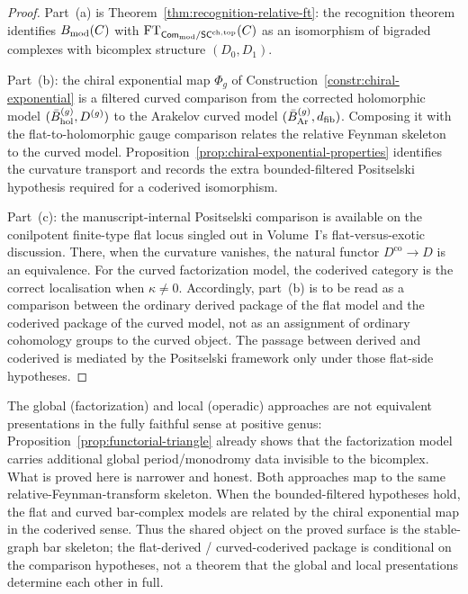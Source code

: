 \begin{proof}
Part~(a) is Theorem~\ref{thm:recognition-relative-ft}: the recognition theorem identifies $B_{\mathrm{mod}}(C)$ with $\mathrm{FT}_{\mathsf{Com}_{\mathrm{mod}} / \mathsf{SC}^{\mathrm{ch,top}}}(C)$ as an isomorphism of bigraded complexes with bicomplex structure $(D_0, D_1)$.

Part~(b): the chiral exponential map $\Phi_g$ of Construction~\ref{constr:chiral-exponential} is a filtered curved comparison from the corrected holomorphic model $(\bar{B}_{\mathrm{hol}}^{(g)},D^{(g)})$ to the Arakelov curved model $(\bar{B}_{\mathrm{Ar}}^{(g)}, d_{\mathrm{fib}})$. Composing it with the flat-to-holomorphic gauge comparison relates the relative Feynman skeleton to the curved model. Proposition~\ref{prop:chiral-exponential-properties} identifies the curvature transport and records the extra bounded-filtered Positselski hypothesis required for a coderived isomorphism.

Part~(c): the manuscript-internal Positselski comparison is available
on the conilpotent finite-type flat locus singled out in Volume~I's
flat-versus-exotic discussion.
There, when the curvature vanishes, the natural functor
$D^{\mathrm{co}} \to D$ is an equivalence. For the curved
factorization model, the coderived category is the correct
localisation when $\kappa \neq 0$. Accordingly, part~(b) is to be
read as a comparison between the ordinary derived package of the
flat model and the coderived package of the curved model, not as
an assignment of ordinary cohomology groups to the curved object.
The passage between derived and coderived is mediated by the
Positselski framework only under those flat-side hypotheses.
\end{proof}

\begin{remark}
\label{rem:single-structural-principle}
The global (factorization) and local (operadic) approaches are
not equivalent presentations in the fully faithful sense at
positive genus: Proposition~\ref{prop:functorial-triangle}
already shows that the factorization model carries additional
global period/monodromy data invisible to the bicomplex.
What is proved here is narrower and honest. Both approaches map
to the same relative-Feynman-transform skeleton. When the
bounded-filtered hypotheses hold, the flat and curved bar-complex
models are related by the chiral exponential map in the coderived
sense. Thus the shared object on the proved surface is the
stable-graph bar skeleton; the flat-derived / curved-coderived
package is conditional on the comparison hypotheses, not a theorem
that the global and local presentations determine each other in
full.
\end{remark}

